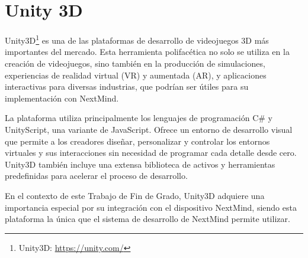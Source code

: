 \section{Unity 3D}

Unity3D\footnote{Unity3D: \url{https://unity.com/}} es una de las plataformas de desarrollo de videojuegos 3D más importantes del mercado. Esta herramienta polifacética no solo se utiliza en la creación de videojuegos, sino también en la producción de simulaciones, experiencias de realidad virtual (VR) y aumentada (AR), y aplicaciones interactivas para diversas industrias, que podrían ser útiles para su implementación con NextMind.



La plataforma utiliza principalmente los lenguajes de programación C\# y UnityScript, una variante de JavaScript. Ofrece un entorno de desarrollo visual que permite a los creadores diseñar, personalizar y controlar los entornos virtuales y sus interacciones sin necesidad de programar cada detalle desde cero. Unity3D también incluye una extensa biblioteca de activos y herramientas predefinidas para acelerar el proceso de desarrollo.



En el contexto de este Trabajo de Fin de Grado, Unity3D adquiere una importancia especial por su integración con el dispositivo NextMind, siendo esta plataforma la única que el sistema de desarrollo de NextMind permite utilizar.
